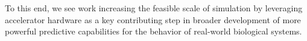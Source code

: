 To this end, we see work increasing the feasible scale of simulation by leveraging accelerator hardware as a key contributing step in broader development of more powerful predictive capabilities for the behavior of real-world biological systems.
